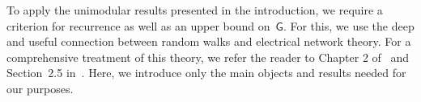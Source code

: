 \documentclass[a4paper,11pt]{article}
\newcommand{\eqdef}{\stackrel{\mathrm{def}}{=}}
\theoremstyle{definition}
\begin{document}
To apply the unimodular results presented in the introduction, we require a criterion for recurrence as well as an upper bound on~$\mathsf G$. For this, we use the deep and useful connection between random walks and electrical network theory. For a comprehensive treatment of this theory, we refer the reader to Chapter 2 of~\cite{LyonsPeres17} and Section~2.5 in~\cite{Nachmias20}. Here, we introduce only the main objects and results needed for our purposes. 


\end{document}

